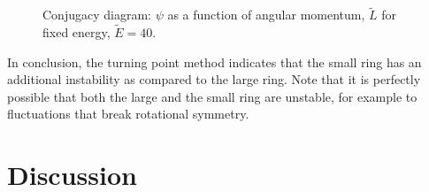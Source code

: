 \documentclass[12pt,a4paper]{article}
\newcommand{\tE}{\widetilde{E}}
\newcommand{\tL}{\widetilde{L}}
\begin{document}
\begin{figure}
%
 \begin{center}
  
 \caption{Conjugacy diagram: $\psi$ as a function of angular momentum, $\tL$
for fixed energy, $\tE=40$.}\label{turn:fig}
 \end{center}
\end{figure}

In conclusion, the turning point method indicates that the small
ring has an additional instability as compared to the large ring.
Note that it is perfectly possible that both the large and the small
ring are unstable, for example to fluctuations that break rotational
symmetry.





%
%
%
%
%


\section{Discussion}\label{sec:discuss}
\end{document}
